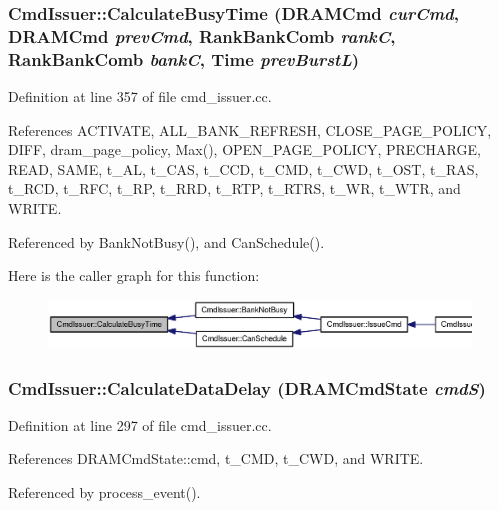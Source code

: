 \subsubsection[{CalculateBusyTime}]{ CmdIssuer::CalculateBusyTime ({\bf DRAMCmd} {\em curCmd}, \/  {\bf DRAMCmd} {\em prevCmd}, \/  {\bf RankBankComb} {\em rankC}, \/  {\bf RankBankComb} {\em bankC}, \/  {\bf Time} {\em prevBurstL})}\label{classCmdIssuer_46557041a802ab092db4a9a3738ac142}




Definition at line 357 of file cmd\_\-issuer.cc.

References ACTIVATE, ALL\_\-BANK\_\-REFRESH, CLOSE\_\-PAGE\_\-POLICY, DIFF, dram\_\-page\_\-policy, Max(), OPEN\_\-PAGE\_\-POLICY, PRECHARGE, READ, SAME, t\_\-AL, t\_\-CAS, t\_\-CCD, t\_\-CMD, t\_\-CWD, t\_\-OST, t\_\-RAS, t\_\-RCD, t\_\-RFC, t\_\-RP, t\_\-RRD, t\_\-RTP, t\_\-RTRS, t\_\-WR, t\_\-WTR, and WRITE.

Referenced by BankNotBusy(), and CanSchedule().

Here is the caller graph for this function:\nopagebreak
\begin{figure}[H]
\begin{center}
\leavevmode
\includegraphics[width=420pt]{classCmdIssuer_46557041a802ab092db4a9a3738ac142_icgraph}
\end{center}
\end{figure}
\subsubsection[{CalculateDataDelay}]{ CmdIssuer::CalculateDataDelay ({\bf DRAMCmdState} {\em cmdS})}\label{classCmdIssuer_4455c4f070b8d8f9e6ae11a1e972b955}




Definition at line 297 of file cmd\_\-issuer.cc.

References DRAMCmdState::cmd, t\_\-CMD, t\_\-CWD, and WRITE.

Referenced by process\_\-event().


